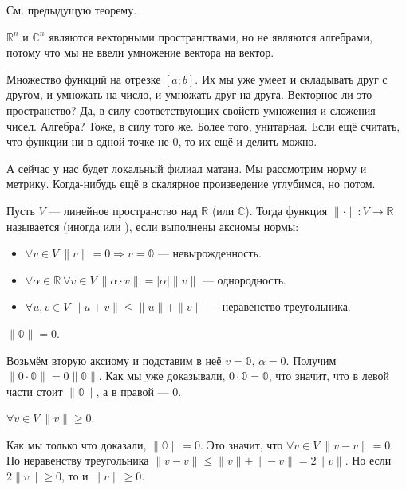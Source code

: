 \documentclass{article}
\begin{document}
\begin{itemize}
\begin{Proof}
            См. предыдущую теорему.
        \end{Proof}
        \begin{Example}
            $\mathbb R^n$ и $\mathbb C^n$ являются векторными пространствами, но не являются алгебрами, потому что мы не ввели умножение вектора на вектор.
        \end{Example}
        \begin{Example}
            Множество функций на отрезке $[a;b]$. Их мы уже умеет и складывать друг с другом, и умножать на число, и умножать друг на друга. Векторное ли это пространство? Да, в силу соответствующих свойств умножения и сложения чисел. Алгебра? Тоже, в силу того же. Более того, унитарная. Если ещё считать, что функции ни в одной точке не 0, то их ещё и делить можно.
        \end{Example}
        \begin{Comment}
            А сейчас у нас будет локальный филиал матана. Мы рассмотрим норму и метрику. Когда-нибудь ещё в скалярное произведение углубимся, но потом.
        \end{Comment}
        \dfn Пусть $V$ --- линейное пространство над $\mathbb R$ (или $\mathbb C$). Тогда функция $\|\cdot\|\colon V\to\mathbb R$ называется  (иногда  или ), если выполнены аксиомы нормы:
        \begin{itemize}
            \item $\forall v\in V~\|v\|=0\Rightarrow v=\mathbb0$ --- невырожденность.
            \item $\forall\alpha\in\mathbb R~\forall v\in V~\|\alpha\cdot v\|=|\alpha|\|v\|$ --- однородность.
            \item $\forall u,v\in V~\|u+v\|\leqslant\|u\|+\|v\|$ --- неравенство треугольника.
        \end{itemize}
        \thm $\|\mathbb0\|=0$.
        \begin{Proof}
            Возьмём вторую аксиому и подставим в неё $v=\mathbb0$, $\alpha=0$. Получим $\|0\cdot\mathbb0\|=0\|\mathbb0\|$. Как мы уже доказывали, $0\cdot\mathbb0=\mathbb0$, что значит, что в левой части стоит $\|\mathbb0\|$, а в правой --- $0$.
        \end{Proof}
        \thm $\forall v\in V~\|v\|\geqslant0$.
        \begin{Proof}
            Как мы только что доказали, $\|\mathbb0\|=0$. Это значит, что $\forall v\in V~\|v-v\|=0$. По неравенству треугольника $\|v-v\|\leqslant\|v\|+\|-v\|=2\|v\|$. Но если $2\|v\|\geqslant0$, то и $\|v\|\geqslant0$.

\end{Proof}
\end{itemize}
\end{document}
